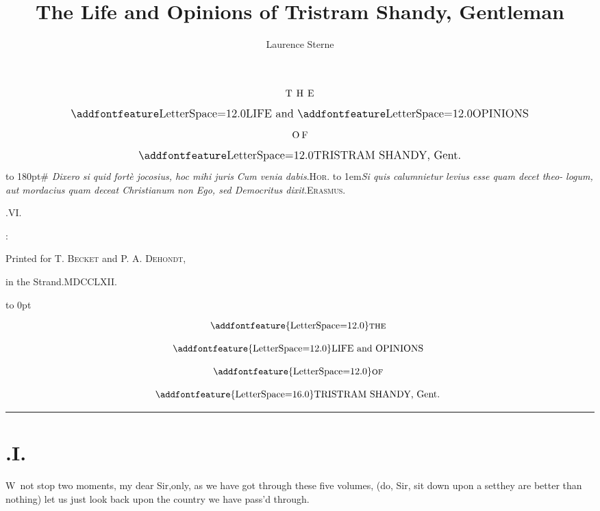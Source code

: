 \documentclass{article}
\title{The Life and Opinions of Tristram Shandy, Gentleman}
\author{Laurence Sterne}
\begin{document}
\pagestyle{empty}
\null
\vfill
$$\vbox{\openup 10pt\halign{\hss #\hss\cr
\hbox to 3em{T H E}\cr
\large \ls{LIFE} and \ls{OPINIONS}\cr
\hbox to 1.6em{O F}\cr
\large \ls{TRISTRAM SHANDY}, Gent.\cr
}}$$
\vfill
\newpage
\null
\newpage %
\vbox{\openup 10pt}
\vfill
\vbox{\openup -2pt\halign to 180pt{\footnotesize #\cr
\textit{Dixero si quid fortè jocosius, hoc mihi juris}\hfill\cr
\textit{Cum venia dabis}.\tsh \hfill \textsc{Hor.}\cr
\noalign{\vskip 4pt}
\hbox to 1em{\tsk}\textit{Si quis calumnietur levius esse quam decet theo-}\cr
\quad\textit{logum, aut mordacius quam deceat Christianum}\cr
\quad\textit{\tsk non Ego, sed Democritus dixit}.\tsk\hfill\textsc{Erasmus}.\cr}}
\vfill
\centerline{.\quad VI.}
\vfill
\centerline{:}
\centerline{\small Printed for T. \textsc{Becket} and P. A. \textsc{Dehondt},}
\centerline{\small in the Strand.\quad MDCCLXII.}

\newpage
\null
\newpage
\pagestyle{fancy}
\thispagestyle{empty}
\setcounter{page}{1}
\hbox{}\vskip -36pt
\moveright 88pt\vbox to 0pt{\hsize
40pt\vss}

\[\vbox{\openup 12pt\halign{\hss # \hss\cr
\addfontfeature{LetterSpace=12.0}\textsc{the}\cr
\addfontfeature{LetterSpace=12.0}LIFE and OPINIONS\cr
\addfontfeature{LetterSpace=12.0}\textsc{of}\cr
{\addfontfeature{LetterSpace=16.0}TRISTRAM SHANDY}, Gent.\cr}}\]

\vskip 12pt
\hrule

\bigskip
\setlength{\baselineskip}{14pt}  %
\sloppy

\section{.\enspace I.}

\lettrine{\Tsk W}{\,} not stop two moments, my dear Sir,\tsk only, as we have got through
these five volumes, (do, Sir, sit down upon a set\tsh they are better than nothing)
let us just look back upon the country we have pass’d through.\tsh
\end{document}
